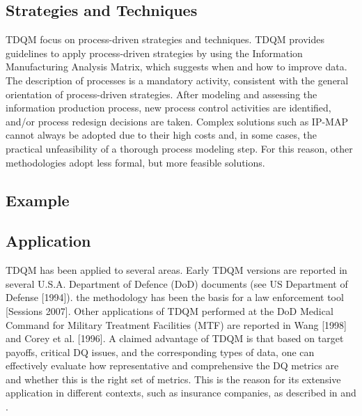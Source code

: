\documentclass[pdftex,english,oribibl]{llncs}
\begin{document}
\subsection{Strategies and Techniques}
TDQM focus on process-driven strategies and techniques. TDQM provides guidelines to apply process-driven strategies by using the Information Manufacturing Analysis Matrix\cite{Ballou1998ModelingInformation}, which suggests when and how to improve data. The description of processes is a mandatory activity, consistent with the general orientation of process-driven strategies. After modeling and assessing the information production process, new process control activities are identified, and/or process redesign decisions are taken.  Complex solutions such as IP-MAP cannot always be adopted due to their high costs and, in some cases, the practical unfeasibility of a thorough process modeling step. For this reason, other methodologies adopt less formal, but more feasible solutions.

\subsection{Example}

\subsection{Application}
TDQM has been applied to several areas. Early TDQM versions are reported in several U.S.A. Department of Defence (DoD) documents (see US Department of Defense [1994]). the methodology has been the basis for a law enforcement tool [Sessions 2007]. Other applications of TDQM performed at the DoD Medical Command for Military Treatment Facilities (MTF) are reported in Wang [1998] and Corey et al. [1996]. A claimed advantage of TDQM is that based on target payoffs, critical DQ issues, and the corresponding types of data, one can effectively evaluate how representative and comprehensive the DQ metrics are and whether this is the right set of metrics. This is the reason for its extensive application in different contexts, such as insurance companies, as described in \cite{Nadkarni2006} and  \cite{Patrick2005}.
\end{document}
